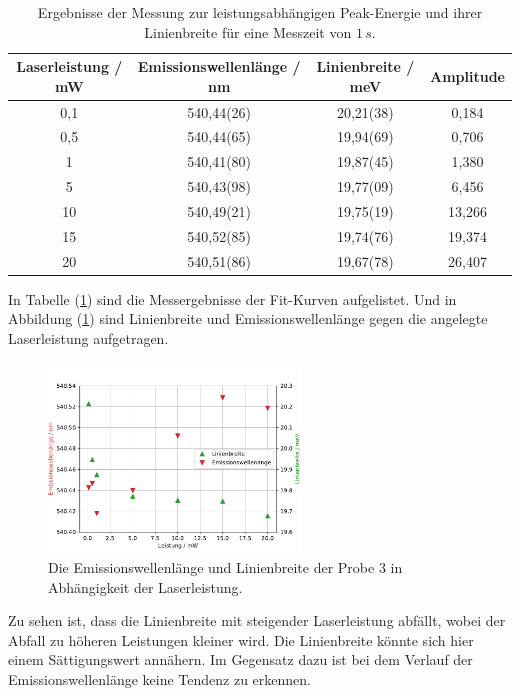 \begin{table}
	\centering
	\caption{Ergebnisse der Messung zur leistungsabh\"{a}ngigen Peak-Energie und ihrer Linienbreite f\"{u}r eine Messzeit von $1 \, s$.}
\begin{tabular}{|cccc|}
	\hline
	{Laserleistung / mW}	&	{Emissionswellenl\"{a}nge / nm}	&	{Linienbreite / meV}	&	{Amplitude}	\\
	\hline
	0,1	&	540,44(26)	&	20,21(38)	&	0,184	\\
	0,5	&	540,44(65)	&	19,94(69)	&	0,706	\\
	1	&	540,41(80)	&	19,87(45)	&	1,380	\\
	5	&	540,43(98)	&	19,77(09)	&	6,456	\\
	10	&	540,49(21)	&	19,75(19)	&	13,266	\\
	15	&	540,52(85)	&	19,74(76)	&	19,374	\\
	20	&	540,51(86)	&	19,67(78)	&	26,407	\\
	\hline
	\end{tabular}
\label{tab:1c_2}
\end{table}
In Tabelle (\ref{tab:1c_2}) sind die Messergebnisse der Fit-Kurven aufgelistet.
Und in Abbildung (\ref{abb:auf1c_ergebnisse}) sind Linienbreite und Emissionswellenl\"{a}nge gegen die angelegte Laserleistung aufgetragen.
\begin{figure}[hbtp]
\centering
	\includegraphics[width=0.6\textwidth]{Plots/aufgabe1c4_wl.pdf}
	\caption{Die Emissionswellenl\"{a}nge und Linienbreite der Probe 3 in Abh\"{a}ngigkeit der Laserleistung.}
	\label{abb:auf1c_ergebnisse}
\end{figure}
Zu sehen ist, dass die Linienbreite mit steigender Laserleistung abf\"{a}llt, wobei der Abfall zu h\"{o}heren Leistungen kleiner wird.
Die Linienbreite k\"{o}nnte sich hier einem S\"{a}ttigungswert ann\"{a}hern.
Im Gegensatz dazu ist bei dem Verlauf der Emissionswellenl\"{a}nge keine Tendenz zu erkennen.

